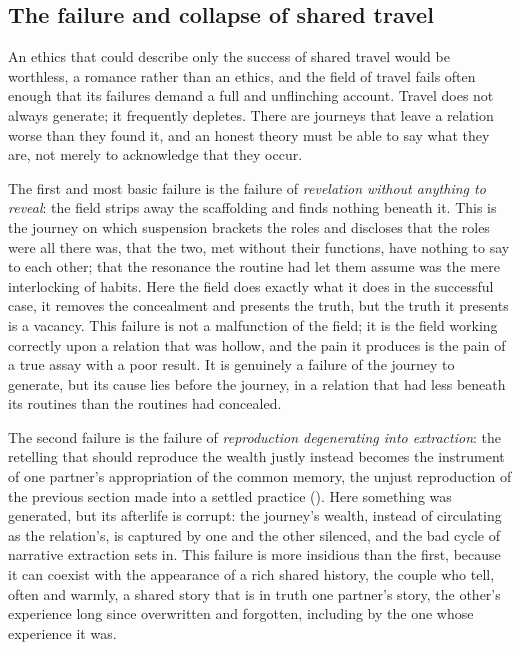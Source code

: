 \subsection{The failure and collapse of shared travel}
\label{p21:sub:ethics-failure}

An ethics that could describe only the success of shared travel would be worthless, a romance rather than an ethics, and the field of travel fails often enough that its failures demand a full and unflinching account. Travel does not always generate; it frequently depletes. There are journeys that leave a relation worse than they found it, and an honest theory must be able to say what they are, not merely to acknowledge that they occur.

The first and most basic failure is the failure of \emph{revelation without anything to reveal}: the field strips away the scaffolding and finds nothing beneath it. This is the journey on which suspension brackets the roles and discloses that the roles were all there was, that the two, met without their functions, have nothing to say to each other; that the resonance the routine had let them assume was the mere interlocking of habits. Here the field does exactly what it does in the successful case, it removes the concealment and presents the truth, but the truth it presents is a vacancy. This failure is not a malfunction of the field; it is the field working correctly upon a relation that was hollow, and the pain it produces is the pain of a true assay with a poor result. It is genuinely a failure of the journey to generate, but its cause lies before the journey, in a relation that had less beneath its routines than the routines had concealed.

The second failure is the failure of \emph{reproduction degenerating into extraction}: the retelling that should reproduce the wealth justly instead becomes the instrument of one partner's appropriation of the common memory, the unjust reproduction of the previous section made into a settled practice (). Here something was generated, but its afterlife is corrupt: the journey's wealth, instead of circulating as the relation's, is captured by one and the other silenced, and the bad cycle of narrative extraction sets in. This failure is more insidious than the first, because it can coexist with the appearance of a rich shared history, the couple who tell, often and warmly, a shared story that is in truth one partner's story, the other's experience long since overwritten and forgotten, including by the one whose experience it was.


